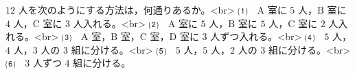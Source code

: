 $12$ 人を次のようにする方法は，何通りあるか。<br>
⑴　$\mathrm{A}$ 室に $5$ 人，$\mathrm{B}$ 室に $4$ 人，$\mathrm{C}$ 室に $3$ 人入れる。<br>
⑵　$\mathrm{A}$ 室に $5$ 人，$\mathrm{B}$ 室に $5$ 人，$\mathrm{C}$ 室に $2$ 人入れる。<br>
⑶　$\mathrm{A}$ 室，$\mathrm{B}$ 室，$\mathrm{C}$ 室，$\mathrm{D}$ 室に $3$ 人ずつ入れる。<br>
⑷　$5$ 人，$4$ 人，$3$ 人の $3$ 組に分ける。<br>
⑸　$5$ 人，$5$ 人，$2$ 人の $3$ 組に分ける。<br>
⑹　$3$ 人ずつ $4$ 組に分ける。
